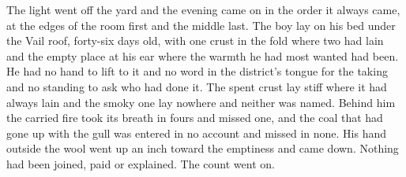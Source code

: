 The light went off the yard and the evening came on in the order it always came, at the edges of the room first and the middle last. The boy lay on his bed under the Vail roof, forty-six days old, with one crust in the fold where two had lain and the empty place at his ear where the warmth he had most wanted had been. He had no hand to lift to it and no word in the district's tongue for the taking and no standing to ask who had done it. The spent crust lay stiff where it had always lain and the smoky one lay nowhere and neither was named. Behind him the carried fire took its breath in fours and missed one, and the coal that had gone up with the gull was entered in no account and missed in none. His hand outside the wool went up an inch toward the emptiness and came down. Nothing had been joined, paid or explained. The count went on.
